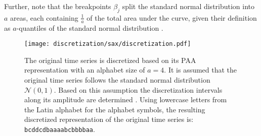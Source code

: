Further, note that the breakpoints $\beta_j$ split the standard normal distribution into $a$ areas, each containing $\frac{1}{a}$ of the total area under the curve, given their definition as $a$-quantiles of the standard normal distribution \cite{SAX_Lin_first}.
\begin{figure}[htb]
\centering
\texttt{[image: discretization/sax/discretization.pdf]}
\caption[Symbolic Aggregate Approximation - Discretization]{The original time series is discretized based on its PAA representation with an alphabet size of $a = 4$. It is assumed that the original time series follows the standard normal distribution $\mathcal{N}(0,1)$. Based on this assumption the discretization intervals along its amplitude are determined \cite{SAX_Lin_first}. Using lowercase letters from the Latin alphabet for the alphabet symbols, the resulting discretized representation of the original time series is: \texttt{bcddcdbaaaabcbbbbaa}.}
\label{fig:SAX_discretization}
\end{figure}
\newpage

